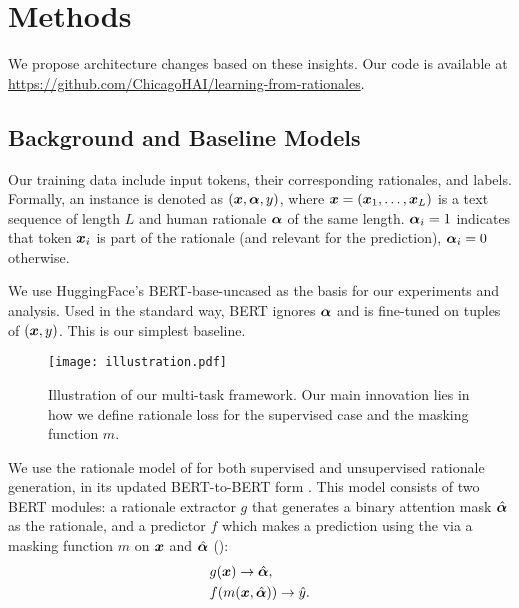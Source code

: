\section{Methods}
\label{sec:methods}


We propose architecture changes based on these insights.
Our code is available at {\small\url{https://github.com/ChicagoHAI/learning-from-rationales}}.

\subsection{Background and Baseline Models}


Our training data include input tokens, their corresponding rationales, and labels.
Formally, an instance is denoted as $(\bm{x}, \bm{\alpha}, y)$, where $\bm{x} = (\bm{x}_1, \ldots, \bm{x}_L)$ is a text sequence of length $L$ and human rationale $\bm{\alpha}$ of the same length.
$\bm{\alpha}_i=1$ indicates that token $\bm{x}_i$ is part of the rationale (and relevant for the prediction), $\bm{\alpha}_i=0$ otherwise.

We use HuggingFace's BERT-base-uncased \citep{devlin_bert:_2018,wolf_huggingfaces_2020} as the basis for our experiments and analysis. Used in the standard way, BERT ignores $\bm{\alpha}$ and is fine-tuned on tuples of $(\bm{x}, y)$. This is our simplest baseline.


\begin{figure}
    \centering
    \texttt{[image: illustration.pdf]}
    \caption{Illustration of our multi-task framework. Our main innovation lies in how we define rationale loss for the supervised case and the masking function $m$.}
    \label{fig:model}
\end{figure}

We use the rationale model of \citet{lei_rationalizing_2016} for both supervised and unsupervised rationale generation, in its updated BERT-to-BERT form \cite{deyoung_eraser_2019}. 
This model consists of two 
BERT modules: a rationale extractor $g$ that generates a binary attention mask $\hat{\bm{\alpha}}$ as the rationale, and a predictor $f$ which makes a prediction using the \rationalizedinput via a masking function $m$ on $\bm{x}$ and $\hat{\bm{\alpha}}$ ():
\begingroup\abovedisplayskip=4pt \belowdisplayskip=4pt
\begin{displaymath}
\begin{aligned}
&g(\bm{x}) \rightarrow \hat{\bm{\alpha}}, \\
&f(m(\bm{x}, \hat{\bm{\alpha}})) \rightarrow \hat{y}.
\end{aligned}
\end{displaymath}
\endgroup



